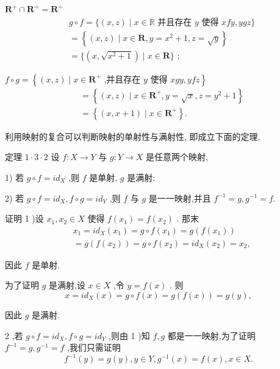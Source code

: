 ${\mathbf{R}}^{ + } \cap  {\mathbf{R}}^{ + } = {\mathbf{R}}^{ + }$
\begin{align*}
	&g \circ  f = \{ \left( {x,z}\right)  \mid  x \in  \mathbb{R}\text{ 并且存在 }y\text{ 使得 }{xfy},{ygz}\}\\
	&= \left\{  {\left( {x,z}\right)  \mid  x \in  \mathbf{R},y = {x}^{2} + 1,z = \sqrt{y}}\right\}\\
	&= \{ \left( {x,\sqrt{{x}^{2} + 1}}\right)  \mid  x \in  \mathbf{R}\} \text{ ; }
\end{align*}

$f \circ  g = \left\{  {\left( {x,z}\right)  \mid  x \in  {\mathbf{R}}^{ + }\text{ ,并且存在 }y\text{ 使得 }{xgy},{yfz}}\right\}$
\begin{align*}
	&= \left\{  {\left( {x,z}\right)  \mid  x \in  {\mathbf{R}}^{ + },y = \sqrt{x},z = {y}^{2} + 1}\right\}\\
	&= \left\{  {\left( {x,x + 1}\right)  \mid  x \in  {\mathbf{R}}^{ + }}\right\}  .
\end{align*}

利用映射的复合可以判断映射的单射性与满射性, 即成立下面的定理,

定理 $1 \cdot  3 \cdot  2$ 设 $f : X \rightarrow  Y$ 与 $g : Y \rightarrow  X$ 是任意两个映射,

1) 若 $g \circ  f = i{d}_{X}$ ,则 $f$ 是单射, $g$ 是满射;

2) 若 $g \circ  f = i{d}_{X},f \circ  g = i{d}_{Y}$ ,则 $f$ 与 $g$ 是一一映射,并且 ${f}^{-1} = g,{g}^{-1} = f.$

证明 1 )设 ${x}_{1},{x}_{2} \in  X$ 使得 $f\left( {x}_{1}\right)  = f\left( {x}_{2}\right)$ . 那末
\begin{align*}
	&{x}_{1} = i{d}_{X}\left( {x}_{1}\right)  = g \circ  f\left( {x}_{1}\right)  = g\left( {f\left( {x}_{1}\right) }\right)\\
	&= g\left( {f\left( {x}_{2}\right) }\right)  = g \circ  f\left( {x}_{2}\right)  = i{d}_{X}\left( {x}_{2}\right)  = {x}_{2},
\end{align*}

因此 $f$ 是单射.

为了证明 $g$ 是满射,设 $x \in  X$ ,令 $y = f\left( x\right)$ . 则
$$x = i{d}_{X}\left( x\right)  = g \circ  f\left( x\right)  = g\left( {f\left( x\right) }\right)  = g\left( y\right) ,$$

因此 $g$ 是满射.

2 ,若 $g \circ  f = i{d}_{X},f \circ  g = i{d}_{Y}$ ,则由 1 )知 $f,g$ 都是一一映射,为了证明 ${f}^{-1} = g,{g}^{-1} = f$ ,我们只需证明
$${f}^{-1}\left( y\right)  = g\left( y\right) ,y \in  Y,{g}^{-1}\left( x\right)  = f\left( x\right) ,x \in  X.$$

